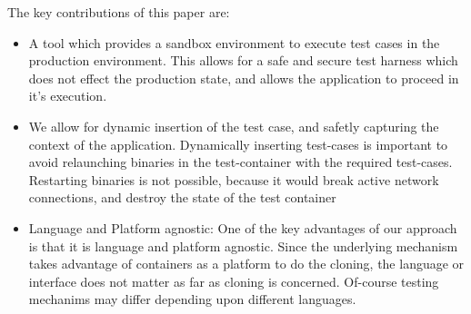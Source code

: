 

The key contributions of this paper are:

\begin{itemize}
\item A tool which provides a sandbox environment to execute test cases in the production environment. 
This allows for a safe and secure test harness which does not effect the production state, and allows the application to proceed in it's execution.
\item We allow for dynamic insertion of the test case, and safetly capturing the context of the application. Dynamically inserting test-cases is important to avoid relaunching binaries in the test-container with the required test-cases. 
Restarting binaries is not possible, because it would break active network connections, and destroy the state of the test container
\item Language and Platform agnostic: One of the key advantages of our approach is that it is language and platform agnostic. Since the underlying mechanism takes advantage of containers as a platform to do the cloning, the language or interface does not matter as far as cloning is concerned. 
Of-course testing mechanims may differ depending upon different languages.
\end{itemize}




